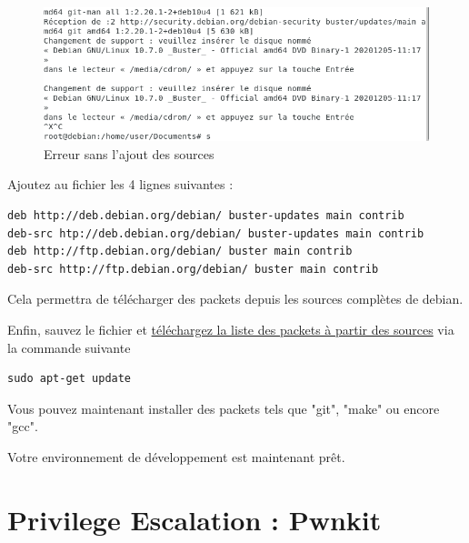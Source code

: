 \documentclass[12pt,a4paper]{article}
\begin{document}
\begin{flushleft}
        \begin{figure}[!h]
         \centering
            \includegraphics[scale=0.6]{cdrom}
            \caption{Erreur sans l'ajout des sources}
        \end{figure}
       \item Ajoutez au fichier les 4 lignes suivantes : 
       \begin{lstlisting}
deb http://deb.debian.org/debian/ buster-updates main contrib
deb-src htp://deb.debian.org/debian/ buster-updates main contrib
deb http://ftp.debian.org/debian/ buster main contrib
deb-src http://ftp.debian.org/debian/ buster main contrib
       \end{lstlisting}
    \item Cela permettra de télécharger des packets depuis les sources complètes de debian. 
    \item Enfin, sauvez le fichier et \underline{téléchargez la liste des packets à partir des sources} via la commande suivante
    \begin{lstlisting}
sudo apt-get update
    \end{lstlisting}
    \item Vous pouvez maintenant installer des packets tels que "git", "make" ou encore "gcc".
    \item Votre environnement de développement est maintenant prêt.
   \end{flushleft}

   \section{Privilege Escalation : Pwnkit}   		
\end{document}
